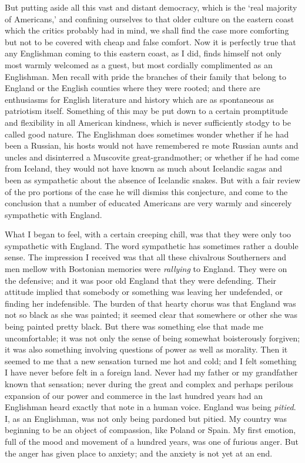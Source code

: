 \documentclass{book}
\begin{document}
But putting aside all this vast and distant democracy, which is the ‘real majority of Americans,’ and confining ourselves to that older culture on the eastern coast which the critics probably had in mind, we shall find the case more comforting but not to be covered with cheap and false comfort. Now it is perfectly true that any Englishman coming to this eastern coast, as I did, finds himself not only most warmly welcomed as a guest, but most cordially complimented as an Englishman. Men recall with pride the branches of their family that belong to England or the English counties where they were rooted; and there are enthusiasms for English literature and history which are as spontaneous as patriotism itself. Something of this may be put down to a certain promptitude and flexibility in all American kindness, which is never sufficiently stodgy to be called good nature. The Englishman does sometimes wonder whether if he had been a Russian, his hosts would not have remembered re mote Russian aunts and uncles and disinterred a Muscovite great-grandmother; or whether if he had come from Iceland, they would not have known as much about Icelandic sagas and been as sympathetic about the absence of Icelandic snakes. But with a fair review of the pro portions of the case he will dismiss this conjecture, and come to the conclusion that a number of educated Americans are very warmly and sincerely sympathetic with England.

What I began to feel, with a certain creeping chill, was that they were only too sympathetic with England. The word sympathetic has sometimes rather a double sense. The impression I received was that all these chivalrous Southerners and men mellow with Bostonian memories were \emph{rallying} to England. They were on the defensive; and it was poor old England that they were defending. Their attitude implied that somebody or something was leaving her undefended, or finding her indefensible. The burden of that hearty chorus was that England was not so black as she was painted; it seemed clear that somewhere or other she was being painted pretty black. But there was something else that made me uncomfortable; it was not only the sense of being somewhat boisterously forgiven; it was also something involving questions of power as well as morality. Then it seemed to me that a new sensation turned me hot and cold; and I felt something I have never before felt in a foreign land. Never had my father or my grandfather known that sensation; never during the great and complex and perhaps perilous expansion of our power and commerce in the last hundred years had an Englishman heard exactly that note in a human voice. England was being \emph{pitied}. I, as an Englishman, was not only being pardoned but pitied. My country was beginning to be an object of compassion, like Poland or Spain. My first emotion, full of the mood and movement of a hundred years, was one of furious anger. But the anger has given place to anxiety; and the anxiety is not yet at an end.
\end{document}
